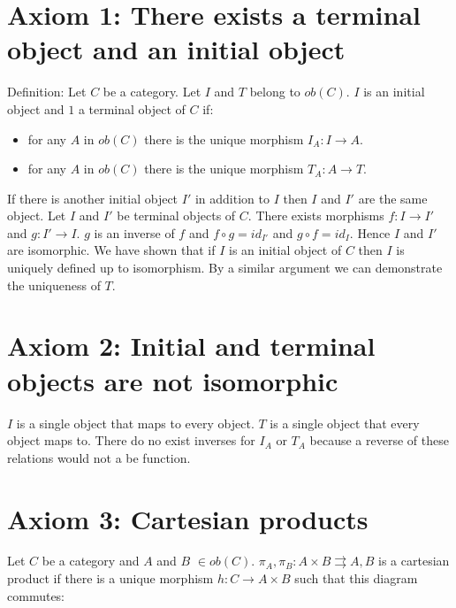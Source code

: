 \documentclass[a4paper, 12pt]{article}
\begin{document}
\section*{Axiom 1: There exists a terminal object and an initial object}
Definition: Let $C$ be a category. Let $I$ and $T$ belong to $ob(C)$. $I$ is an initial object and $1$ a terminal object of $C$ if:
\begin{itemize}
  \item for any $A$ in $ob(C)$ there is the unique morphism $I_{A}: I \longrightarrow A$.
  \item for any $A$ in $ob(C)$ there is the unique morphism $T_{A}: A \longrightarrow T$.
\end{itemize}

\noindent If there is another initial object $I'$ in addition to $I$ then $I$ and $I'$ are the same object. Let $I$ and $I'$ be terminal objects of $C$. There exists morphisms $f: I \longrightarrow I'$ and $g: I' \longrightarrow I$. $g$ is an inverse of $f$ and $f \circ g = id_{I'}$ and $g \circ f = id_{I}$. Hence $I$ and $I'$ are isomorphic. We have shown that if $I$ is an initial object of $C$ then $I$ is uniquely defined up to isomorphism. By a similar argument we can demonstrate the uniqueness of $T$.

\section*{Axiom 2: Initial and terminal objects are not isomorphic}
$I$ is a single object that maps to every object. $T$ is a single object that every object maps to. There do no exist inverses for $I_{A}$ or $T_{A}$ because a reverse of these relations would not a be function.

\section*{Axiom 3: Cartesian products}
Let $C$ be a category and $A$ and $B$ $\in ob(C)$. $\pi _{A}, \pi _{B}: A \times B \rightrightarrows A,B$ is a cartesian product if there is a unique morphism $h: C \longrightarrow A \times B$ such that this diagram commutes:

\usetikzlibrary{positioning}
\end{document}
